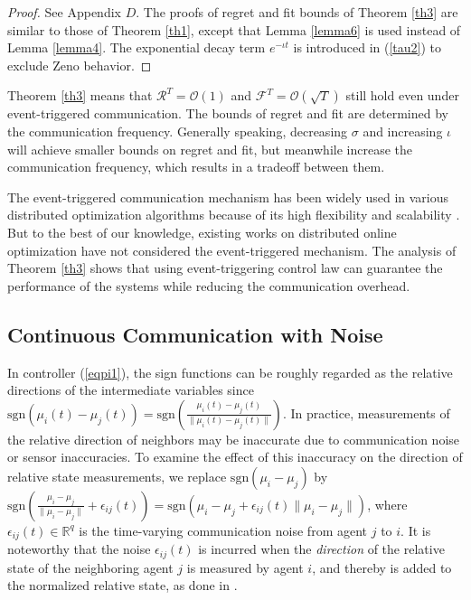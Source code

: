 \documentclass[final,5p,times,twocolumn,authoryear]{elsarticle}
\newcommand{\sign}[1]{\mathrm{sgn}(#1)}
\begin{document}
	\begin{proof}
		See Appendix $D$. The proofs of regret and fit bounds of Theorem \ref{th3} are similar to those of Theorem \ref{th1}, except that Lemma \ref{lemma6} is used instead of Lemma \ref{lemma4}. The exponential decay term $e^{-\iota t}$ is introduced in (\ref{tau2}) to exclude Zeno behavior.	
	\end{proof}
	
	\begin{remark}\label{remark3}
		Theorem \ref{th3} means that $\mathcal{R}^T=\mathcal{O}(1)$ and $\mathcal{F}^T = \mathcal{O}(\sqrt{T})$ still hold even under event-triggered communication. The bounds of regret and fit are determined by the communication frequency. Generally speaking, decreasing $\sigma$ and increasing $\iota$ will achieve smaller bounds on regret and fit, but meanwhile increase the communication frequency, which results in a tradeoff between them.	
	\end{remark}
	
	\begin{remark}
		The event-triggered communication mechanism has been widely used in various distributed optimization algorithms \citep{lzh2020, yy2022, yt2022} because of its  high flexibility and scalability \citep{ now2019}. But to the best of our knowledge, existing works on distributed online optimization have not considered the event-triggered mechanism. The analysis of Theorem \ref{th3} shows that using event-triggering control law can guarantee the performance of the  systems while reducing the communication overhead.
	\end{remark}
	
	
	
	
	\subsection{Continuous Communication with Noise}\label{nono}
	
	In  controller (\ref{eqpi1}), the sign functions can be roughly regarded as the relative directions of the intermediate variables since $\sign{\mu_i(t)-\mu_j(t)}=\sign{\frac{\mu_i(t)-\mu_j(t)}{\|\mu_i(t)-\mu_j(t)\|}}$.
	In practice, measurements of the relative direction of neighbors may be inaccurate due to communication noise or sensor inaccuracies. To examine the effect of this inaccuracy on the direction of relative state measurements, we replace $\sign{\mu_i-\mu_j}$ by $\sign{\frac{\mu_i-\mu_j}{\|\mu_i-\mu_j\|}+\epsilon_{ij}(t)}= \sign{\mu_i-\mu_j+\epsilon_{ij}(t)\|\mu_i-\mu_j\|}$, where $\epsilon_{ij}(t)\in \mathbb{R}^q$ is the time-varying communication noise from agent $j$ to $i$. 
	It is noteworthy that the noise $\epsilon_{ij}(t)$ is incurred when the {\em direction} of the relative state of the neighboring agent $j$ is measured by agent $i$, and thereby is added to the normalized relative state, as done in \citet{cao2021}.
	
\end{document}
